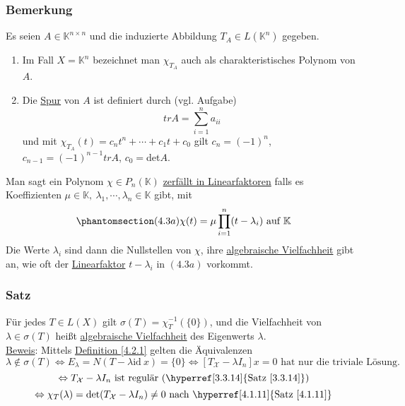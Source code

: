 \subsubsection{Bemerkung}
Es seien $A\in\mathbb{K}^{n\times n}$ und die induzierte Abbildung $T_A\in L(\mathbb{K}^n)$ gegeben.
\renewcommand{\labelenumi}{(\arabic{enumi})}
\begin{enumerate}
\item Im Fall $X=\mathbb{K}^n$ bezeichnet man $\chi _{T_A}$ auch als charakteristisches Polynom von $A$.
\item Die \underline{Spur} von $A$ ist definiert durch (vgl. Aufgabe)
\[trA=\sum _{i=1}^n a_{ii}\]
und mit $\chi _{T_A}(t)=c_nt^n+\cdots +c_1t+c_0$ gilt $c_n=(-1)^n$, $c_{n-1}=(-1)^{n-1}trA$, $c_0=$det$A$.
\end{enumerate}
Man sagt ein Polynom $\chi \in P_n(\mathbb{K})$ \underline{zerfällt in Linearfaktoren} falls es Koeffizienten $\mu \in \mathbb{K},\ \lambda _1,\cdots ,\lambda _n\in\mathbb{K}$ gibt, mit
\[\phantomsection\label{4.3a}(4.3a)\chi (t) =\mu \prod _{i=1}^n (t-\lambda _i)\text{ auf } \mathbb{K}\]
Die Werte $\lambda _i$ sind dann die Nullstellen von $\chi$, ihre \underline{algebraische Vielfachheit} gibt an, wie oft der \underline{Linearfaktor} $t-\lambda _i$ in \hyperref[4.3a]{$(4.3a)$} vorkommt.
\subsubsection{Satz}
Für jedes $T\in L(X)$ gilt $\sigma (T)=\chi _T^{-1}(\{0\})$, und die Vielfachheit von $\lambda \in \sigma (T)$ heißt \underline{algebraische Vielfachheit} des Eigenwerts $\lambda$.\\
\underline{Beweis}: Mittels \hyperref[4.2.1]{Definition \ref{4.2.1}} gelten die Äquivalenzen
\[\lambda \not\in \sigma (T)\Leftrightarrow E_\lambda = N(T-\lambda \mathrm{id}\ x)=\{0\}\Leftrightarrow[T_\mathcal{X}-\lambda I_n]x=0\text{ hat nur die triviale Lösung.}\]
\[\Leftrightarrow T_\mathcal{X}-\lambda I_n\text{ ist regulär (\hyperref[3.3.14]{Satz \ref{3.3.14}})}\]
\[\Leftrightarrow \chi _T(\lambda)=\mathrm{det}(T_\mathcal{X}-\lambda I_n)\not= 0\text{ nach \hyperref[4.1.11]{Satz \ref{4.1.11}}}\]
